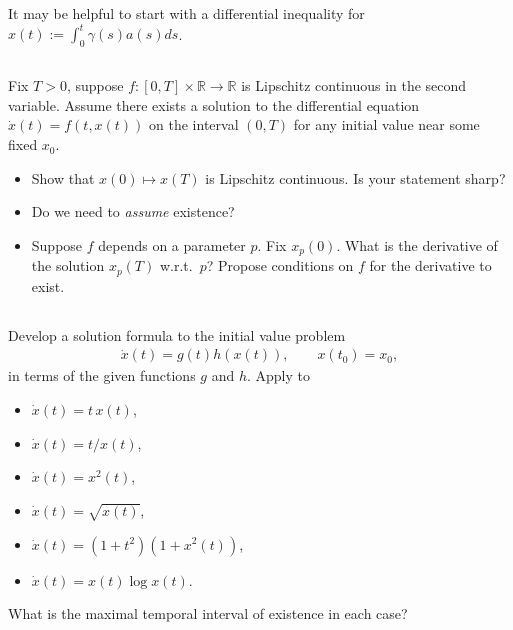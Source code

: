 \documentclass[12pt,a4paper]{article}
\newcommand{\from}{\colon}
\begin{document}
    It may be helpful to
    start with a differential inequality for 
    $x(t) := \int_0^t \gamma(s) a(s) ds$.

    
    \subsection{}
    
    Fix $T > 0$,
    suppose $f \from [0, T] \times \mathbb{R} \to \mathbb{R}$
    is Lipschitz continuous in the second variable.
    Assume there exists a solution to
    the differential equation 
    $\dot{x}(t) = f(t, x(t))$ on the interval $(0, T)$
    for any initial value near some fixed $x_0$.
    
    \begin{itemize}
    \item
        Show that 
        $x(0) \mapsto x(T)$
        is Lipschitz continuous.
        Is your statement sharp?
    \item
        Do we need to \emph{assume} existence?
    \item
        Suppose $f$ depends on a parameter $p$.
        Fix $x_p(0)$.
        What is the derivative of the solution $x_p(T)$ w.r.t.~$p$?
        Propose conditions on $f$ for the derivative to exist.
    \end{itemize}
    
    

    
    \subsection{}

    Develop a solution formula to
    the initial value problem
    \begin{align}
        \dot{x}(t) = g(t) h(x(t)),
        \qquad
        x(t_0) = x_0
        ,
    \end{align}
    in terms of the given functions $g$ and $h$.
    Apply to
    \begin{itemize}
    \item
        $\dot{x}(t) = t \, x(t)$,
    \item
        $\dot{x}(t) = t / x(t)$,
    \item
        $\dot{x}(t) = x^2(t)$,
    \item  
        $\dot{x}(t) = \sqrt{ x(t) }$,
    \item
        $\dot{x}(t) = (1 + t^2) (1 + x^2(t))$,
    \item
        $\dot{x}(t) = x(t) \log x(t)$.
    \end{itemize}
    What is the maximal temporal interval of existence in each case?
\end{document}
